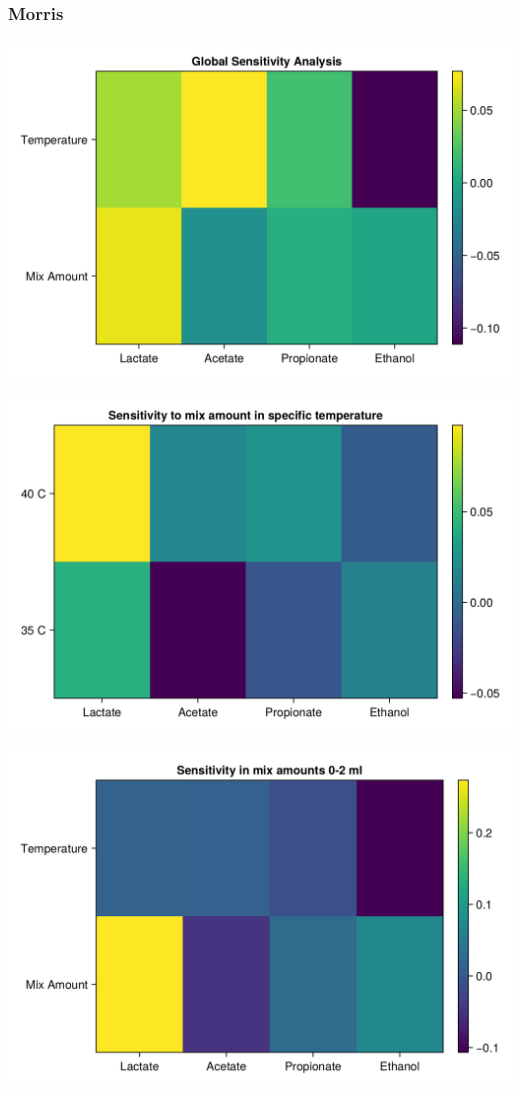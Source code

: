 \documentclass[11pt]{article}
\begin{document}
\subsubsection{Morris}
\label{sec:org137c086}
\begin{center}
\includegraphics[width=.9\linewidth]{../plots/sensitivity/global_morris.png}
\end{center}

\begin{center}
\includegraphics[width=.9\linewidth]{../plots/sensitivity/temp_morris.png}
\end{center}

\begin{center}
\includegraphics[width=.9\linewidth]{../plots/sensitivity/morris_low.png}
\end{center}
\end{document}
